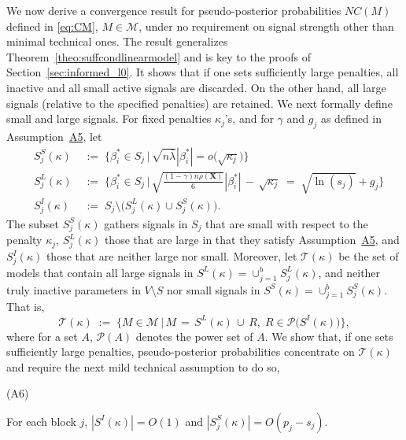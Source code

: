 \documentclass[
  12pt]{article}
\newcommand{\M}{\mathcal{M}}
\newcommand{\T}{\mathcal{T}}
\newcommand{\bX}{\mathbf{X}}
\begin{document}
We now derive a convergence result for pseudo-posterior probabilities $NC(M)$ defined in \eqref{eq:CM}, $M\in\mathcal{M}$, under no requirement on signal strength other than minimal technical ones. The result generalizes Theorem~\ref{theo:suffcondlinearmodel} and is key to the proofs of Section~\ref{sec:informed_l0}. It shows that if one sets sufficiently large penalties, all inactive and all small active signals are discarded. On the other hand, all large signals (relative to the specified penalties) are retained. We next formally define small and large signals. For fixed penalties $\kappa_j$'s, and for 
$\gamma$ and $g_j$ as defined in Assumption~\hyperlink{lab:A5}{A5}, let
\begin{eqnarray}\label{eq:defSes}
    &S_j^{S}(\kappa)\;&:=\;\Bigg\{\beta_i^* \in S_j \,\Big|\,\sqrt{n\bar{\lambda}}|\beta_{i}^*|=o\big(\sqrt{\kappa_j}\big) \Bigg\}\nonumber\\
    &S_j^{L}(\kappa)\;&:=\;\Bigg\{\beta_i^* \in S_j \,\Big|\,\sqrt{\frac{(1-\gamma) n\rho(\bX)}{6}}|\beta_{i}^*| \,- \,\sqrt{\kappa_j} \;=\; \sqrt{\ln(s_j)} + g_j\Bigg\}\label{eq:defslsi}\\
    &S_j^{I}(\kappa)\;&:=\;S_j \setminus \big(S_j^{L}(\kappa) \cup S_j^{S}(\kappa)\big).
    \nonumber 
\end{eqnarray}
The subset $S_j^{S}(\kappa)$ gathers signals in $S_j$ that are small with respect to the penalty $\kappa_j$, $S_j^{L}(\kappa)$ those that are large in that they satisfy Assumption~\hyperlink{lab:A5}{A5}, and $S_j^{I}(\kappa)$ those that are neither large nor small. Moreover, let $\T(\kappa)$ be the set of models that contain all large signals in $S^{L}(\kappa)=\cup_{j=1}^b S_j^{L}(\kappa)$, and neither truly inactive parameters in $V\setminus S$ nor small signals in $S^S(\kappa)=\cup_{j=1}^b S^{S}_j(\kappa)$. That is,
\begin{equation} \label{eq:Tkappa}
   \T(\kappa) \;:=\;\Big\{M \in \M \,\big|\, M\,=\, S^L(\kappa)\,\cup\,R,\; R\in \mathcal{P}\big(S^{I}(\kappa)\big)  \Big\},
\end{equation}
where for a set $A$, $ \mathcal{P}(A)$ denotes the power set of $A$. We show that, if one sets sufficiently large penalties, pseudo-posterior probabilities concentrate on $\T(\kappa)$ and require the next mild technical assumption to do so,

\hypertarget{lab:A6}{(A6)} \quad For each block $j$, $|S^{I}(\kappa)|=O(1)$ and $|S^{S}_j(\kappa)|=O(p_j-s_j)$.
\end{document}
